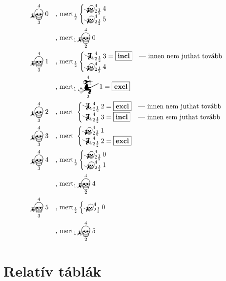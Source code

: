\documentclass{article}
\newcommand{\just}[1]{\boxed{#1}}%
\newcommand{\incl}{\mathbf{incl}}
\newcommand{\excl}{\mathbf{excl}}
\newcommand{\mainfunA}[3]{\mathwitch_{#2}^{#1}#3}
\newcommand{\mainfunB}[3]{\reversemathwitch_{#2}^{#1}#3}
\newcommand{\nomainfunA}[3]{{}_{\mathwitch}\!\!\!\!\bigskull^{#1}_{#2}#3}
\newcommand{\nomainfunB}[3]{{}_{\reversemathwitch}\!\!\!\!\bigskull^{#1}_{#2}#3}
\begin{document}
	\begin{align*}
		&\nomainfunA430   &&\text{, mert}_\frac12\begin{cases}\nomainfunB4{2\frac12}4\\\nomainfunB4{2\frac12}5\end{cases}\\
		&                &&\text{, mert}_1\nomainfunA420\\
		&\nomainfunA431   &&\text{, mert}_\frac12\begin{cases}\mainfunB4{2\frac12}3 = \just\incl&\text{--- innen nem juthat tovább}\\\nomainfunB4{2\frac12}4\end{cases}\\
		&                &&\text{, mert}_1\mainfunA421 = \just\excl\\
		&\nomainfunA432   &&\text{, mert }\begin{cases}\mainfunB4{2\frac12}2 = \just\excl&\text{--- innen nem juthat tovább}\\\mainfunB4{2\frac12}3 = \just\incl&\text{--- innen sem juthat tovább}\end{cases}\\
		&\nomainfunA433   &&\text{, mert }\begin{cases}\nomainfunB4{2\frac12}1\\\mainfunB4{2\frac12}2 = \just\excl&\end{cases}\\
		&\nomainfunA434   &&\text{, mert}_\frac12\begin{cases}\nomainfunB4{2\frac12}0\\\nomainfunB4{2\frac12}1\end{cases}\\
		&                &&\text{, mert}_1\nomainfunA424\\
		&\nomainfunA435   &&\text{, mert}_\frac12\begin{cases}\nomainfunB4{2\frac12}0\end{cases}\\
		&                &&\text{, mert}_1\nomainfunA425
	\end{align*}


	\section{Relatív táblák}
\end{document}
